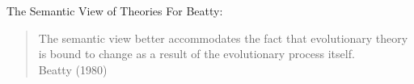 \documentclass{beamer}
\begin{document}
\begin{frame}{The Semantic View of Theories}
	For Beatty:
	\begin{quote}
		The semantic view better accommodates the fact that evolutionary theory is bound to change as a result of the evolutionary process itself.\\
		Beatty (1980)
	\end{quote}
\end{frame}
\end{document}
